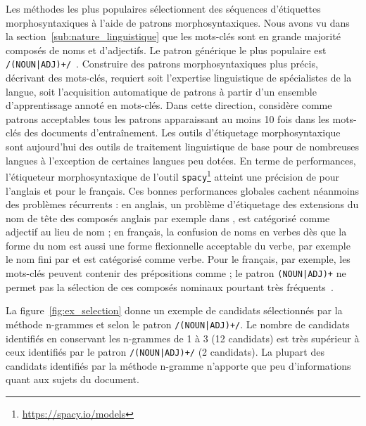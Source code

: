 Les méthodes les plus populaires sélectionnent des séquences d'étiquettes morphosyntaxiques à l'aide de patrons morphosyntaxiques. 
Nous avons vu dans la section~\ref{sub:nature_linguistique} que les mots-clés sont en grande majorité composés de noms et d'adjectifs.
Le patron générique le plus populaire est \texttt{/(NOUN|ADJ)+/}~\cite[\textit{inter alia}]{mihalcea_textrank:_2004,wan_collabrank:_2008,bougouin_topicrank:_2013}. %
Construire des patrons morphosyntaxiques plus précis, décrivant des mots-clés, requiert soit l'expertise linguistique de spécialistes de la langue, soit l'acquisition automatique de patrons à partir d'un ensemble d'apprentissage annoté en mots-clés.
Dans cette direction, \citet{hulth_improved_2003} considère comme patrons acceptables tous les patrons apparaissant au moins 10 fois dans les mots-clés des documents d'entraînement.
Les outils d'étiquetage morphosyntaxique sont aujourd'hui des outils de traitement linguistique de base pour de nombreuses langues à l'exception de certaines langues peu dotées.
En terme de performances, l'étiqueteur morphosyntaxique de l'outil \texttt{spacy}\footnote{\url{https://spacy.io/models}} atteint une précision de  pour l'anglais et  pour le français.
Ces bonnes performances globales cachent néanmoins des problèmes récurrents :
en anglais, un problème d'étiquetage des extensions du nom de tête des composés anglais par exemple dans ,  est catégorisé comme adjectif au lieu de nom ;
en français, la confusion de noms en verbes dès que la forme du nom est aussi une forme flexionnelle acceptable du verbe, par exemple le nom  fini par  et est catégorisé comme verbe.
Pour le français, par exemple, les mots-clés peuvent contenir des prépositions comme ; le patron \texttt{(NOUN|ADJ)+} ne permet pas la sélection de ces composés nominaux pourtant très fréquents~\cite{daille_term_2017}.


La figure~\ref{fig:ex_selection} donne un exemple de candidats sélectionnés par la méthode n-grammes et selon le patron \texttt{/(NOUN|ADJ)+/}. Le nombre de candidats identifiés en conservant les n-grammes de 1 à 3 (12 candidats) est très supérieur à ceux identifiés par le patron \texttt{/(NOUN|ADJ)+/} (2 candidats).
La plupart des candidats identifiés par la méthode n-gramme n'apporte que peu d'informations quant aux sujets du document.

